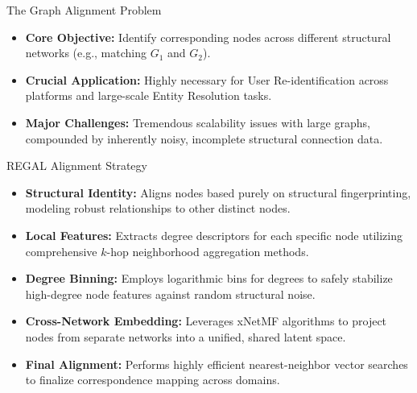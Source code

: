 \documentclass[11pt, aspectratio=169]{beamer}
\begin{document}
\begin{frame}{The Graph Alignment Problem}
    \begin{itemize}
        \item \textbf{Core Objective:} Identify corresponding nodes across different structural networks (e.g., matching $G_1$ and $G_2$).
        \vspace{0.4cm}
        \item \textbf{Crucial Application:} Highly necessary for User Re-identification across platforms and large-scale Entity Resolution tasks.
        \vspace{0.4cm}
        \item \textbf{Major Challenges:} Tremendous scalability issues with large graphs, compounded by inherently noisy, incomplete structural connection data.
    \end{itemize}
\end{frame}

\begin{frame}{REGAL Alignment Strategy}
    \begin{itemize}
        \item \textbf{Structural Identity:} Aligns nodes based purely on structural fingerprinting, modeling robust relationships to other distinct nodes.
        \item \textbf{Local Features:} Extracts degree descriptors for each specific node utilizing comprehensive $k$-hop neighborhood aggregation methods.
        \item \textbf{Degree Binning:} Employs logarithmic bins for degrees to safely stabilize high-degree node features against random structural noise.
        \item \textbf{Cross-Network Embedding:} Leverages xNetMF algorithms to project nodes from separate networks into a unified, shared latent space.
        \item \textbf{Final Alignment:} Performs highly efficient nearest-neighbor vector searches to finalize correspondence mapping across domains.
    \end{itemize}
\end{frame}
\end{document}
